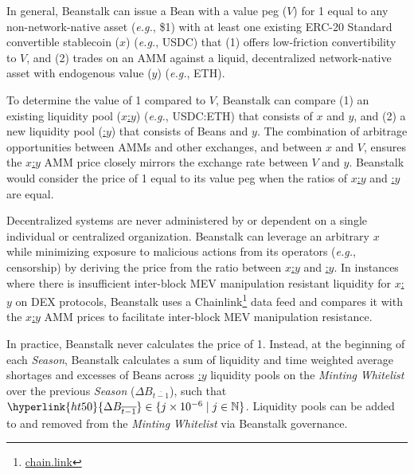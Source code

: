 \documentclass[tikz]{article}
\newcommand{\term}[1]{\textsl{#1}}
\newcommand{\fref}[1]{\footnote{\href{http://#1}{#1}}}
\newcommand{\Bean}{} %
\begin{document}
In general, Beanstalk can issue a Bean with a value peg (\hyperlink{ht216}{$V$}) for \Bean1 equal to any non-network-native asset (\term{e.g.}, \$1) with at least one existing ERC-20 Standard convertible stablecoin (\hyperlink{ht223}{$x$}) (\term{e.g.}, USDC) that (1) offers low-friction convertibility to \hyperlink{ht216}{$V$}, and (2) trades on an AMM against a liquid, decentralized network-native asset with endogenous value (\hyperlink{ht227}{$y$}) (\term{e.g.}, ETH). 

To determine the value of \Bean1 compared to \hyperlink{ht216}{$V$}, Beanstalk can compare (1) an existing liquidity pool (\hyperlink{ht224}{$x$:$y$}) (\term{e.g.}, USDC:ETH) that consists of \hyperlink{ht223}{$x$} and \hyperlink{ht227}{$y$}, and (2) a new liquidity pool (\hyperlink{ht6}{\Bean:$y$}) that consists of Beans and \hyperlink{ht227}{$y$}. The combination of arbitrage opportunities between AMMs and other exchanges, and between \hyperlink{ht223}{$x$} and \hyperlink{ht216}{$V$}, ensures the \hyperlink{ht224}{$x$:$y$} AMM price closely mirrors the exchange rate between \hyperlink{ht216}{$V$} and \hyperlink{ht227}{$y$}. Beanstalk would consider the price of \Bean1 equal to its value peg when the ratios of \hyperlink{ht224}{$x$:$y$} and \hyperlink{ht6}{\Bean:$y$} are equal. 

Decentralized systems are never administered by or dependent on a single individual or centralized organization. Beanstalk can leverage an arbitrary \hyperlink{ht223}{$x$} while minimizing exposure to malicious actions from its operators (\term{e.g.}, censorship) by deriving the price from the ratio between \hyperlink{ht224}{$x$:$y$} and \hyperlink{ht6}{\Bean:$y$}. In instances where there is insufficient inter-block MEV manipulation resistant liquidity for \hyperlink{ht224}{$x$:$y$} on DEX protocols, Beanstalk uses a Chainlink\fref{chain.link} data feed and compares it with the \hyperlink{ht224}{$x$:$y$} AMM prices to facilitate inter-block MEV manipulation resistance.

In practice, Beanstalk never calculates the price of \Bean1. Instead, at the beginning of each \term{Season}, Beanstalk calculates a sum of liquidity and time weighted average shortages and excesses of Beans across \hyperlink{ht6}{\Bean:$y$} liquidity pools on the \term{Minting} \term{Whitelist} over the previous \term{Season} (\hyperlink{ht50}{$\Delta B_{\overline{t-1}}$}), such that $\hyperlink{ht50}{\Delta B_{\overline{t-1}}} \in \{j \times 10^{-6} \mid j \in \mathbb{N} \}$. Liquidity pools can be added to and removed from the \term{Minting} \term{Whitelist} via Beanstalk governance.
\end{document}
